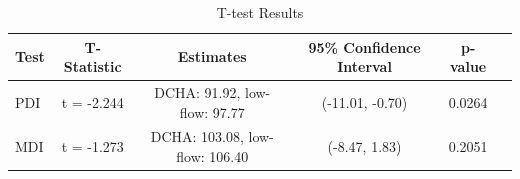 \documentclass{article}
\begin{document}
\begin{enumerate}
		\begin{table}[h!]
			\centering
			\footnotesize
			\caption{T-test Results}
			\label{tab:t_test_results}
			\begin{tabular}{lccccc}
				\toprule
				\textbf{Test}   & \textbf{T-Statistic}  & \textbf{Estimates}           & \textbf{95\% Confidence Interval} & \textbf{p-value} \\
				\midrule
				PDI             & t = -2.244            & DCHA: 91.92, low-flow: 97.77 & (-11.01, -0.70)                  & 0.0264          \\
				MDI             & t = -1.273            & DCHA: 103.08, low-flow: 106.40 & (-8.47, 1.83)                    & 0.2051          \\
				\bottomrule
			\end{tabular}
		\end{table}
			
			
			
			
			
		
	\end{enumerate}
		
\end{document}
